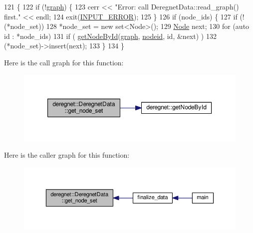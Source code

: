 \begin{DoxyCode}
121                                                                    \{
122     \textcolor{keywordflow}{if} (!\hyperlink{classderegnet_1_1DeregnetData_ab76d30fa2ef87099faecb31e3f95b6d6}{graph}) \{
123         cerr << \textcolor{stringliteral}{"Error: call DeregnetData::read\_graph() first."} << endl;
124         exit(\hyperlink{DeregnetData_8h_a288116f92845fddefeb044f5b84bc889}{INPUT\_ERROR});
125     \}
126     \textcolor{keywordflow}{if} (node\_ids) \{
127         \textcolor{keywordflow}{if} (!(*node\_set))
128             *node\_set = \textcolor{keyword}{new} set<Node>();
129         \hyperlink{namespacederegnet_a744bad34f2de9856d36715a445f027f3}{Node} next;
130         \textcolor{keywordflow}{for} (\textcolor{keyword}{auto} \textcolor{keywordtype}{id} : *node\_ids)
131             \textcolor{keywordflow}{if} ( \hyperlink{namespacederegnet_afefc9088a0ea47e8d8c1225b5de29244}{getNodeById}(\hyperlink{classderegnet_1_1DeregnetData_ab76d30fa2ef87099faecb31e3f95b6d6}{graph}, \hyperlink{classderegnet_1_1DeregnetData_a3b57d7ed19c104c7fe257e17f0d2cfb5}{nodeid}, \textcolor{keywordtype}{id}, &next) )
132                 (*node\_set)->insert(next);
133     \}
134 \}
\end{DoxyCode}


Here is the call graph for this function\+:\nopagebreak
\begin{figure}[H]
\begin{center}
\leavevmode
\includegraphics[width=350pt]{classderegnet_1_1DeregnetData_a7d662c0dd84d814bbaaf56718a99306a_cgraph}
\end{center}
\end{figure}




Here is the caller graph for this function\+:\nopagebreak
\begin{figure}[H]
\begin{center}
\leavevmode
\includegraphics[width=350pt]{classderegnet_1_1DeregnetData_a7d662c0dd84d814bbaaf56718a99306a_icgraph}
\end{center}
\end{figure}


